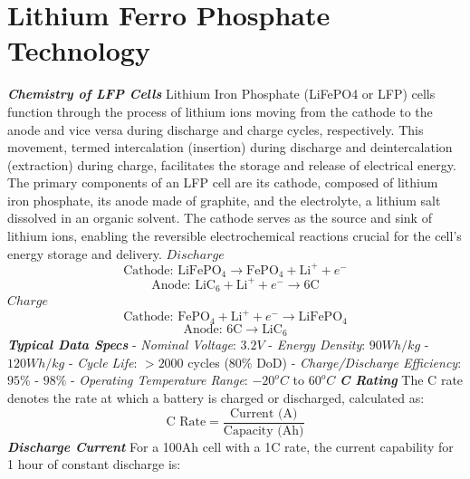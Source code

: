 \section{Lithium Ferro Phosphate Technology}\label{sec:LFP}
\textbf{\emph{Chemistry of LFP Cells}}\newline
\noindent
Lithium Iron Phosphate (LiFePO4 or LFP) cells function through the process of lithium ions moving from the cathode to the anode and vice versa during discharge and charge cycles, respectively. This movement, termed intercalation (insertion) during discharge and deintercalation (extraction) during charge, facilitates the storage and release of electrical energy. The primary components of an LFP cell are its cathode, composed of lithium iron phosphate, its anode made of graphite, and the electrolyte, a lithium salt dissolved in an organic solvent. The cathode serves as the source and sink of lithium ions, enabling the reversible electrochemical reactions crucial for the cell's energy storage and delivery.\cite{LiFePO4Wiki}\newline\newline
\noindent
$Discharge$
\[ \text{Cathode: } \text{LiFePO}_4 \rightarrow \text{FePO}_4 + \text{Li}^+ + e^- \]
\[ \text{Anode: } \text{LiC}_6 + \text{Li}^+ + e^- \rightarrow 6\text{C} \]
$Charge$
\[ \text{Cathode: } \text{FePO}_4 + \text{Li}^+ + e^- \rightarrow \text{LiFePO}_4 \]
\[ \text{Anode: } 6\text{C} \rightarrow \text{LiC}_6 \]
\newpage
\noindent
\textbf{\emph{Typical Data Specs}}\newline
\noindent
- \emph{Nominal Voltage}: $3.2V$\newline
- \emph{Energy Density}: $90 Wh/kg$ - $120 Wh/kg$\newline
- \emph{Cycle Life}: $>2000$ cycles ($80\%$ DoD)\newline
- \emph{Charge/Discharge Efficiency}: $95\%$ - $98\%$\newline
- \emph{Operating Temperature Range}: $-20^{o}C$ to $60^{o}C$\newline\newline
\noindent
\textbf{\emph{C Rating}}\newline
\noindent
The C rate denotes the rate at which a battery is charged or discharged, calculated as:
\[ \text{C Rate} = \frac{\text{Current (A)}}{\text{Capacity (Ah)}} \]
\noindent
\textbf{\emph{Discharge Current}}\newline
\noindent
For a 100Ah cell with a 1C rate, the current capability for 1 hour of constant discharge is:
